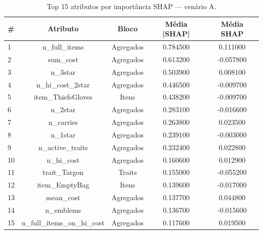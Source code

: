 \begin{table}[htbp]
\caption{Top 15 atributos por importância SHAP — cenário A.}
\label{tab:topA}
\centering
\small
\begin{tabular}{lcccc}
\toprule
\# & Atributo & Bloco & Média |SHAP| & Média SHAP \\
\midrule
1 & n\_full\_items & Agregados & 0.784500 & 0.111000 \\
2 & sum\_cost & Agregados & 0.613200 & -0.057800 \\
3 & n\_3star & Agregados & 0.503900 & 0.008100 \\
4 & n\_hi\_cost\_2star & Agregados & 0.446500 & -0.009700 \\
5 & item\_ThiefsGloves & Itens & 0.438200 & -0.009700 \\
6 & n\_2star & Agregados & 0.283100 & -0.016600 \\
7 & n\_carries & Agregados & 0.263800 & 0.023500 \\
8 & n\_1star & Agregados & 0.239100 & -0.003000 \\
9 & n\_active\_traits & Agregados & 0.232400 & 0.022800 \\
10 & n\_hi\_cost & Agregados & 0.160600 & 0.012900 \\
11 & trait\_Targon & Traits & 0.155000 & -0.055200 \\
12 & item\_EmptyBag & Itens & 0.139600 & -0.017000 \\
13 & mean\_cost & Agregados & 0.137700 & 0.044800 \\
14 & n\_emblems & Agregados & 0.136700 & -0.015600 \\
15 & n\_full\_items\_on\_hi\_cost & Agregados & 0.117600 & 0.019500 \\
\bottomrule
\end{tabular}
\end{table}

